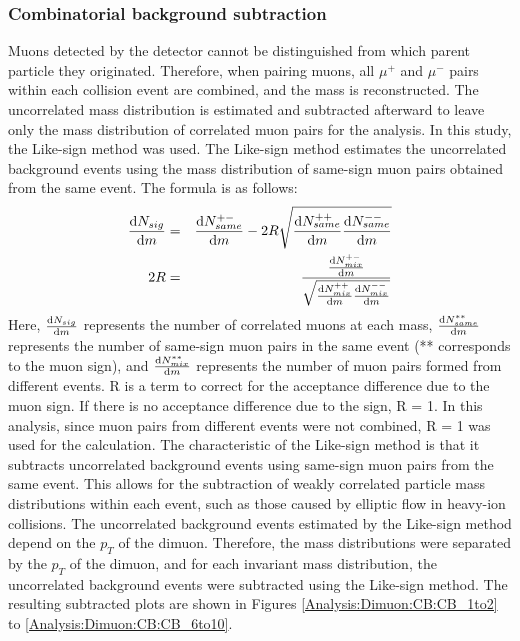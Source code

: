             \subsubsection{Combinatorial background subtraction}
            \label{Analysis:Dimuon:Combinatorial BG subtraction}
                Muons detected by the detector cannot be distinguished from which parent particle they originated. Therefore, when pairing muons, all $\mu^+$ and $\mu^-$ pairs within each collision event are combined, and the mass is reconstructed. The uncorrelated mass distribution is estimated and subtracted afterward to leave only the mass distribution of correlated muon pairs for the analysis. In this study, the Like-sign method was used. The Like-sign method estimates the uncorrelated background events using the mass distribution of same-sign muon pairs obtained from the same event. The formula is as follows:
                \begin{eqnarray}
                    \dv{N_{sig}}{m} &=& \dv{N_{same}^{+-}}{m} - 2R \sqrt{\dv{N_{same}^{++}}{m} \dv{N_{same}^{--}}{m}}\\
                    2R &=& \frac{\dv{N_{mix}^{+-}}{m}}{\sqrt{\dv{N_{mix}^{++}}{m} \dv{N_{mix}^{--}}{m}}} 
                \end{eqnarray}
                Here, $\dv{N_{sig}}{m}$ represents the number of correlated muons at each mass, $\dv{N_{same}^{**}}{m}$ represents the number of same-sign muon pairs in the same event (** corresponds to the muon sign), and $\dv{N_{mix}^{**}}{m}$ represents the number of muon pairs formed from different events. R is a term to correct for the acceptance difference due to the muon sign. If there is no acceptance difference due to the sign, R = 1. In this analysis, since muon pairs from different events were not combined, R = 1 was used for the calculation.
                The characteristic of the Like-sign method is that it subtracts uncorrelated background events using same-sign muon pairs from the same event. This allows for the subtraction of weakly correlated particle mass distributions within each event, such as those caused by elliptic flow in heavy-ion collisions. The uncorrelated background events estimated by the Like-sign method depend on the $p_T$ of the dimuon. Therefore, the mass distributions were separated by the $p_T$ of the dimuon, and for each invariant mass distribution, the uncorrelated background events were subtracted using the Like-sign method. The resulting subtracted plots are shown in Figures \ref{Analysis:Dimuon:CB:CB_1to2} to \ref{Analysis:Dimuon:CB:CB_6to10}.
